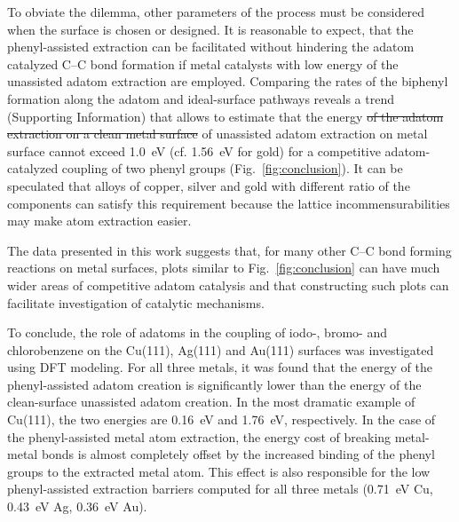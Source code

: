\documentclass[aps,prb,amsmath,amssymb,11pt]{revtex4-1}
\newcommand{\sinfo}{Supporting Information}
\newcommand{\zhzh}{\color{blue}}
\newcommand{\zhzh}{\color{blue}}
\begin{document}
To obviate the dilemma, other parameters of the process must be considered when the surface is chosen or designed. It is reasonable to expect, that the phenyl-assisted extraction can be facilitated without hindering the adatom catalyzed C--C bond formation if metal catalysts with low energy of the unassisted adatom extraction are employed. 
%
Comparing the rates of the biphenyl formation along the adatom and ideal-surface pathways reveals a trend (\sinfo) that allows to estimate that the energy \sout{of the adatom extraction on a clean metal surface} {\zhzh of unassisted adatom extraction on metal surface} cannot exceed \SI{1.0}{\electronvolt} (cf. \SI{1.56}{\electronvolt} for gold) for a competitive adatom-catalyzed coupling of two phenyl groups (Fig.~\ref{fig:conclusion}).
It can be speculated that alloys of copper, silver and gold with different ratio of the components can satisfy this requirement because the lattice incommensurabilities may make atom extraction easier. 


The data presented in this work suggests that, for many other C--C bond forming reactions on metal surfaces, plots similar to Fig.~\ref{fig:conclusion} can have much wider areas of competitive adatom catalysis and that constructing such plots can facilitate investigation of catalytic mechanisms. 


To conclude, the role of adatoms in the coupling of iodo-, bromo- and chlorobenzene on the Cu(111), Ag(111) and Au(111) surfaces was investigated using DFT modeling. For all three metals, it was found that the energy of the phenyl-assisted adatom creation is significantly lower than the energy of the clean-surface unassisted adatom creation. In the most dramatic example of Cu(111), the two energies are \SI{0.16}{\electronvolt} and \SI{1.76}{\electronvolt}, respectively. In the case of the phenyl-assisted metal atom extraction, the energy cost of breaking metal-metal bonds is almost completely offset by the increased binding of the phenyl groups to the extracted metal atom. This effect is also responsible for the low phenyl-assisted extraction barriers computed for all three metals (\SI{0.71}{\electronvolt} Cu, \SI{0.43}{\electronvolt} Ag, \SI{0.36}{\electronvolt} Au). 
\end{document}
